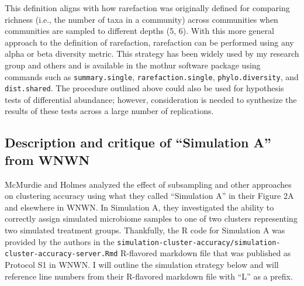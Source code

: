 \documentclass[
]{article}
\begin{document}
This definition aligns with how rarefaction was originally defined for
comparing richness (i.e., the number of taxa in a community) across
communities when communities are sampled to different depths (5, 6).
With this more general approach to the definition of rarefaction,
rarefaction can be performed using any alpha or beta diversity metric.
This strategy has been widely used by my research group and others and
is available in the mothur software package using commands such as
\texttt{summary.single}, \texttt{rarefaction.single},
\texttt{phylo.diversity}, and \texttt{dist.shared}. The procedure
outlined above could also be used for hypothesis tests of differential
abundance; however, consideration is needed to synthesize the results of
these tests across a large number of replications.

\hypertarget{description-and-critique-of-simulation-a-from-wnwn}{%
\subsection{Description and critique of ``Simulation A'' from
WNWN}\label{description-and-critique-of-simulation-a-from-wnwn}}

McMurdie and Holmes analyzed the effect of subsampling and other
approaches on clustering accuracy using what they called ``Simulation
A'' in their Figure 2A and elsewhere in WNWN. In Simulation A, they
investigated the ability to correctly assign simulated microbiome
samples to one of two clusters representing two simulated treatment
groups. Thankfully, the R code for Simulation A was provided by the
authors in the
\texttt{simulation-cluster-accuracy/simulation-cluster-accuracy-server.Rmd}
R-flavored markdown file that was published as Protocol S1 in WNWN. I
will outline the simulation strategy below and will reference line
numbers from their R-flavored markdown file with ``L'' as a prefix.
\end{document}
